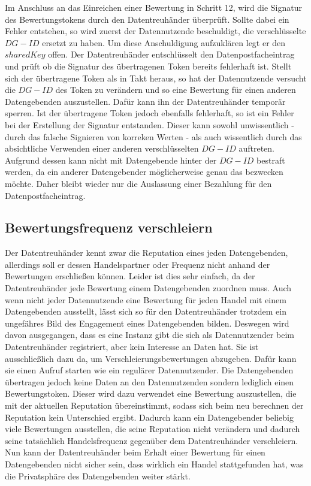 \documentclass{scrreprt}
\begin{document}
\begin{enumerate}
    Im Anschluss an das Einreichen einer Bewertung in Schritt 12, wird die Signatur des Bewertungstokens durch den Datentreuhänder überprüft. Sollte dabei ein Fehler entstehen, so wird zuerst der Datennutzende beschuldigt, die verschlüsselte $DG-ID$ ersetzt zu haben. Um diese Anschuldigung aufzuklären legt er den $sharedKey$ offen. Der Datentreuhänder entschlüsselt den Datenpostfacheintrag und prüft ob die Signatur des übertragenen Token bereits fehlerhaft ist. Stellt sich der übertragene Token als in Takt heraus, so hat der Datennutzende versucht die $DG-ID$ des Token zu verändern und so eine Bewertung für einen anderen Datengebenden auszustellen. Dafür kann ihn der Datentreuhänder temporär sperren. Ist der übertragene Token jedoch ebenfalls fehlerhaft, so ist ein Fehler bei der Erstellung der Signatur entstanden. Dieser kann sowohl unwissentlich - durch das falsche Signieren von korreken Werten - als auch wissentlich durch das absichtliche Verwenden einer anderen verschlüsselten $DG-ID$ auftreten. Aufgrund dessen kann nicht mit Datengebende hinter der $DG-ID$ bestraft werden, da ein anderer Datengebender möglicherweise genau das bezwecken möchte. Daher bleibt wieder nur die Auslassung einer Bezahlung für den Datenpostfacheintrag.
\end{enumerate}

\subsection{Bewertungsfrequenz verschleiern}
Der Datentreuhänder kennt zwar die Reputation eines jeden Datengebenden, allerdings soll er dessen Handelspartner oder Frequenz nicht anhand der Bewertungen erschließen können. Leider ist dies sehr einfach, da der Datentreuhänder jede Bewertung einem Datengebenden zuordnen muss. Auch wenn nicht jeder Datennutzende eine Bewertung für jeden Handel mit einem Datengebenden ausstellt, lässt sich so für den Datentreuhänder trotzdem ein ungefähres Bild des Engagement eines Datengebenden bilden. Deswegen wird davon ausgegangen, dass es eine Instanz gibt die sich als Datennutzender beim Datentreuhänder registriert, aber kein Interesse an Daten hat. Sie ist ausschließlich dazu da, um Verschleierungsbewertungen abzugeben. Dafür kann sie einen Aufruf starten wie ein regulärer Datennutzender. Die Datengebenden übertragen jedoch keine Daten an den Datennutzenden sondern lediglich einen Bewertungstoken. Dieser wird dazu verwendet eine Bewertung auszustellen, die mit der aktuellen Reputation übereinstimmt, sodass sich beim neu berechnen der Reputation kein Unterschied ergibt. Dadurch kann ein Datengebender beliebig viele Bewertungen ausstellen, die seine Reputation nicht verändern und dadurch seine tatsächlich Handelsfrequenz gegenüber dem Datentreuhänder verschleiern. Nun kann der Datentreuhänder beim Erhalt einer Bewertung für einen Datengebenden nicht sicher sein, dass wirklich ein Handel stattgefunden hat, was die Privatsphäre des Datengebenden weiter stärkt.\\
\end{document}
